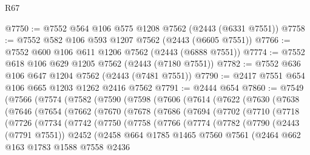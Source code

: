\begin{lexlean}{R67}
\begin{coremodule}
@7750 := @7552 @564 @106 @575 @1208 @7562 (@2443 (@6331 @7551))
@7758 := @7552 @582 @106 @593 @1207 @7562 (@2443 (@6605 @7551))
@7766 := @7552 @600 @106 @611 @1206 @7562 (@2443 (@6888 @7551))
@7774 := @7552 @618 @106 @629 @1205 @7562 (@2443 (@7180 @7551))
@7782 := @7552 @636 @106 @647 @1204 @7562 (@2443 (@7481 @7551))
@7790 := @2417 @7551 @654 @106 @665 @1203 @1262 @2416 @7562
@7791 := @2444 @654
@7860 := @7549
    (@7566
      (@7574
        (@7582
          (@7590
            (@7598
              (@7606
                (@7614
                  (@7622
                    (@7630
                      (@7638
                        (@7646
                          (@7654
                            (@7662
                              (@7670
                                (@7678
                                  (@7686
                                    (@7694
                                      (@7702
                                        (@7710
                                          (@7718
                                            (@7726
                                              (@7734
                                                (@7742
                                                  (@7750
                                                    (@7758
                                                      (@7766
                                                        (@7774
                                                          (@7782
                                                            (@7790
                                                              (@2443 (@7791 @7551))
                                                              @2452
                                                              (@2458
                                                                @664
                                                                @1785
                                                                @1465
                                                                @7560
                                                                @7561
                                                                (@2464
                                                                  @662
                                                                  @163
                                                                  @1783
                                                                  @1588
                                                                  @7558
                                                                  @2436

\end{coremodule}
\end{lexlean}
